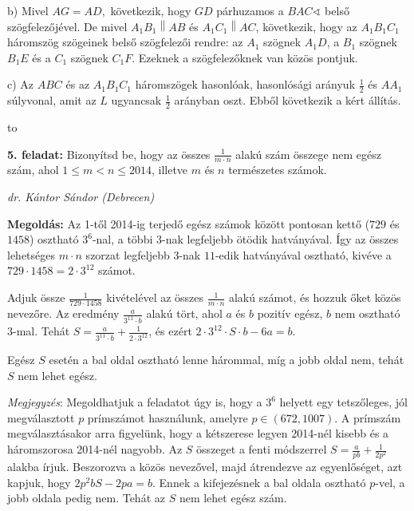 \documentclass[a4paper,10pt]{article}
\newcommand{\ki}[2]{\hfill {\it #1 (#2)}\medskip}
\newcommand{\vonal}{\hbox to \hsize{\hskip2truecm\hrulefill\hskip2truecm}}
\begin{document}
b)  Mivel $AG=AD,$ következik, hogy $GD$ párhuzamos a
${BAC}\sphericalangle$ belső szögfelezőjével. De mivel
${A_1}{B_1}\left\| {AB} \right.$ és ${A_1}{C_1}\left\| {AC}
\right.$, következik, hogy az ${A_1}{B_1}{C_1}$ háromszög
szögeinek belső szögfelezői rendre: az ${A_1}$ szögnek
${A_1}D$, a ${B_1}$ szögnek ${B_1}E$ és a ${C_1}$ szögnek ${C_1}F$.
Ezeknek a szögfelezőknek van közös pontjuk.

c) Az $ABC$ és az ${A_1}{B_1}{C_1}$ háromszögek hasonlóak,
hasonlósági arányuk $\frac{1}{2}$ és $A{A_1}$ súlyvonal, amit az
$L$ ugyancsak $\frac{1}{2}$ arányban oszt. Ebből következik a
kért állítás.

\medskip

\vonal

{\bf 5. feladat: } Bizonyítsd be, hogy az összes $\frac{1}{m\cdot n}$
alakú szám összege nem egész szám, ahol $1\leq
m<n\leq2014$, illetve $m$ és $n$ természetes számok.


\ki{dr. Kántor Sándor}{Debrecen}\medskip

{\bf Megoldás: } Az 1-től 2014-ig terjedő egész számok
között pontosan kettő ($729$ és $1458$) osztható
$3^6$-nal, a többi $3$-nak legfeljebb ötödik hatványával.
Így az összes lehetséges $m\cdot n$ szorzat legfeljebb $3$-nak
$11$-edik hatványával osztható, kivéve a $729\cdot 1458 =
2\cdot 3^{12}$ számot.

Adjuk össze $\displaystyle \frac{1}{729\cdot 1458}$
kivételével az összes $\displaystyle \frac{1}{m\cdot n}$
alakú számot, és hozzuk őket közös nevezőre. Az
eredmény $\displaystyle \frac{a}{3^{11}\cdot b}$ alakú tört,
ahol $a$ és $b$ pozitív egész, $b$ nem osztható $3$-mal.
Tehát $S=\displaystyle \frac{a}{3^{11}\cdot b}+\displaystyle
\frac{1}{2\cdot 3^{12}}$, és ezért  $2 \cdot 3^{12}\cdot S\cdot
b-6a=b.$

Egész $S$ esetén a bal oldal osztható lenne hárommal, míg
a jobb oldal nem, tehát $S$ nem lehet egész.


\medskip
\textit{Megjegyzés}:  Megoldhatjuk a feladatot úgy is, hogy a
${3^6}$ helyett egy tetszőleges, jól megválasztott $p$ prímszámot
hasz\-ná\-lunk, amelyre $p \in \left( {672,1007} \right)$. A
prímszám meg\-vá\-lasz\-tá\-sakor arra figyelünk, hogy a kétszerese
legyen 2014-nél kisebb és a há\-rom\-szo\-ro\-sa 2014-nél nagyobb.
Az $S$ összeget a fenti módszerrel $S = \frac{a}{{pb}} +
\frac{1}{{2{p^2}}}$ alakba írjuk. Beszorozva a közös nevez\H
ovel, majd átrendezve az egyenlőséget, azt kapjuk, hogy
$2{p^2}bS - 2pa = b.$ Ennek a kifejezésnek a bal oldala osztható
$p$-vel, a jobb oldala pedig nem. Tehát az $S$ nem lehet egész szám.
\end{document}
